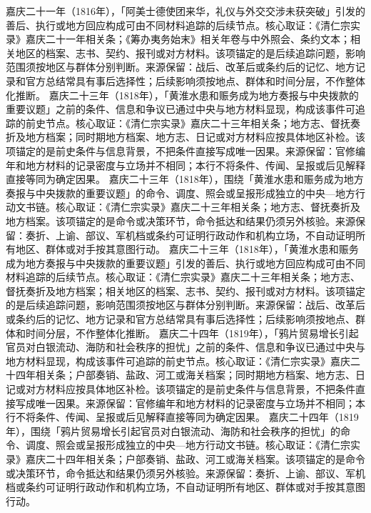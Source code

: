 嘉庆二十一年（1816年），「阿美士德使团来华，礼仪与外交交涉未获突破」引发的善后、执行或地方回应构成可由不同材料追踪的后续节点。核心取证：《清仁宗实录》嘉庆二十一年相关条；《筹办夷务始末》相关年卷与中外照会、条约文本；相关地区的档案、志书、契约、报刊或对方材料。该项锚定的是后续追踪问题，影响范围须按地区与群体分别判断。来源保留：战后、改革后或条约后的记忆、地方记录和官方总结常具有事后选择性；后续影响须按地点、群体和时间分层，不作整体化推断。
嘉庆二十三年（1818年），「黄淮水患和赈务成为地方奏报与中央拨款的重要议题」之前的条件、信息和争议已通过中央与地方材料显现，构成该事件可追踪的前史节点。核心取证：《清仁宗实录》嘉庆二十三年相关条；地方志、督抚奏折及地方档案；同时期地方档案、地方志、日记或对方材料应按具体地区补检。该项锚定的是前史条件与信息背景，不把条件直接写成唯一因果。来源保留：官修编年和地方材料的记录密度与立场并不相同；本行不将条件、传闻、呈报或后见解释直接等同为确定因果。
嘉庆二十三年（1818年），围绕「黄淮水患和赈务成为地方奏报与中央拨款的重要议题」的命令、调度、照会或呈报形成独立的中央—地方行动文书链。核心取证：《清仁宗实录》嘉庆二十三年相关条；地方志、督抚奏折及地方档案。该项锚定的是命令或决策环节，命令抵达和结果仍须另外核验。来源保留：奏折、上谕、部议、军机档或条约可证明行政动作和机构立场，不自动证明所有地区、群体或对手按其意图行动。
嘉庆二十三年（1818年），「黄淮水患和赈务成为地方奏报与中央拨款的重要议题」引发的善后、执行或地方回应构成可由不同材料追踪的后续节点。核心取证：《清仁宗实录》嘉庆二十三年相关条；地方志、督抚奏折及地方档案；相关地区的档案、志书、契约、报刊或对方材料。该项锚定的是后续追踪问题，影响范围须按地区与群体分别判断。来源保留：战后、改革后或条约后的记忆、地方记录和官方总结常具有事后选择性；后续影响须按地点、群体和时间分层，不作整体化推断。
嘉庆二十四年（1819年），「鸦片贸易增长引起官员对白银流动、海防和社会秩序的担忧」之前的条件、信息和争议已通过中央与地方材料显现，构成该事件可追踪的前史节点。核心取证：《清仁宗实录》嘉庆二十四年相关条；户部奏销、盐政、河工或海关档案；同时期地方档案、地方志、日记或对方材料应按具体地区补检。该项锚定的是前史条件与信息背景，不把条件直接写成唯一因果。来源保留：官修编年和地方材料的记录密度与立场并不相同；本行不将条件、传闻、呈报或后见解释直接等同为确定因果。
嘉庆二十四年（1819年），围绕「鸦片贸易增长引起官员对白银流动、海防和社会秩序的担忧」的命令、调度、照会或呈报形成独立的中央—地方行动文书链。核心取证：《清仁宗实录》嘉庆二十四年相关条；户部奏销、盐政、河工或海关档案。该项锚定的是命令或决策环节，命令抵达和结果仍须另外核验。来源保留：奏折、上谕、部议、军机档或条约可证明行政动作和机构立场，不自动证明所有地区、群体或对手按其意图行动。
